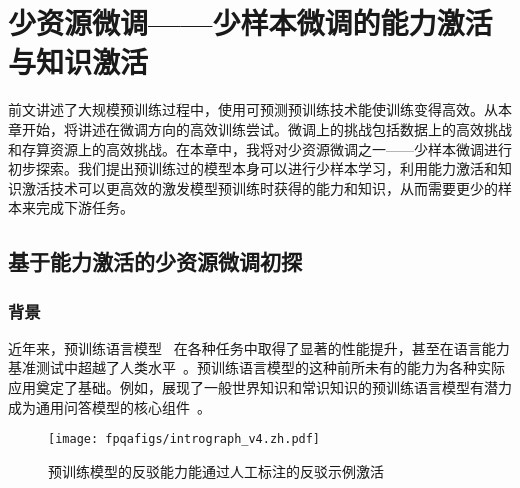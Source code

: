\chapter{少资源微调——少样本微调的能力激活与知识激活}

前文讲述了大规模预训练过程中，使用可预测预训练技术能使训练变得高效。从本章开始，将讲述在微调方向的高效训练尝试。微调上的挑战包括数据上的高效挑战和存算资源上的高效挑战。在本章中，我将对少资源微调之一——少样本微调进行初步探索。我们提出预训练过的模型本身可以进行少样本学习，利用能力激活和知识激活技术可以更高效的激发模型预训练时获得的能力和知识，从而需要更少的样本来完成下游任务。


\section{基于能力激活的少资源微调初探}

\subsection{背景}
近年来，预训练语言模型~\cite{lewis-etal-2020-bart, han2021pretrained, raffel2020exploring, brown2020language} 在各种任务中取得了显著的性能提升，甚至在语言能力基准测试中超越了人类水平~\cite{wang-etal-2018-glue, wang2019superglue,srivastava2022beyond}。预训练语言模型的这种前所未有的能力为各种实际应用奠定了基础。例如，展现了一般世界知识和常识知识的预训练语言模型有潜力成为通用问答模型的核心组件~\cite{tafjord2021general,guu2020retrieval}。

\begin{figure}[!htpb]
    \centering
    \texttt{[image: fpqafigs/intrograph\_v4.zh.pdf]}
    \caption{预训练模型的反驳能力能通过人工标注的反驳示例激活}
    \label{fig:intrograph}
\end{figure}

\begin{table}[]
    \centering
    \caption{一些先前的研究指出了预训练模型面对误导性问题的脆弱性}
    \label{tab:intro_example}
\end{table}

